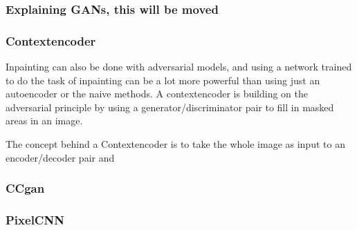     
    
    
    
      \subsubsection{Explaining GANs, this will be moved}
      
    
      \subsubsection{Contextencoder}
    Inpainting can also be done with adversarial models, and using a network trained to do the task of inpainting can be a lot more powerful than using just an autoencoder or the naive methods.
    A contextencoder is building on the adversarial principle by using a generator/discriminator pair to fill in masked areas in an image. 
    
    The concept behind a Contextencoder is to take the whole image as input to an encoder/decoder pair and 
    
    
    
      \subsubsection{CCgan}
      \subsubsection{PixelCNN}
      
\fi

  
 
